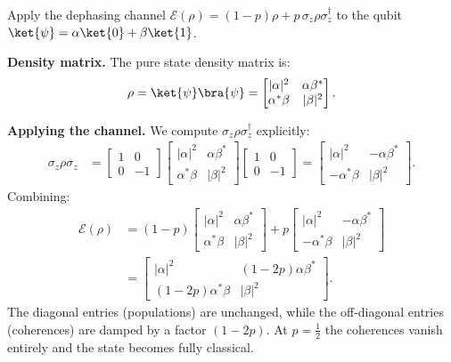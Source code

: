\documentclass[oneside]{academica}
\begin{document}
\begin{exercise*}
  Apply the dephasing channel $\mathcal{E}(\rho)=(1-p)\rho+p\,\sigma_z\rho\sigma_z^\dagger$
  to the qubit $\ket{\psi}=\alpha\ket{0}+\beta\ket{1}$.

  \textbf{Density matrix.}
  The pure state density matrix is:
  \begin{equation*}
    \rho = \ket{\psi}\bra{\psi} =
    \begin{bmatrix}|\alpha|^2 & \alpha\beta^* \\ \alpha^*\beta & |\beta|^2\end{bmatrix}.
  \end{equation*}

  \textbf{Applying the channel.}
  We compute $\sigma_z\rho\sigma_z^\dagger$ explicitly:
  \begin{align*}
    \sigma_z\rho\sigma_z &=
    \begin{bmatrix}1&0\\0&-1\end{bmatrix}
    \begin{bmatrix}|\alpha|^2 & \alpha\beta^* \\ \alpha^*\beta & |\beta|^2\end{bmatrix}
    \begin{bmatrix}1&0\\0&-1\end{bmatrix}
    = \begin{bmatrix}|\alpha|^2 & -\alpha\beta^* \\ -\alpha^*\beta & |\beta|^2\end{bmatrix}.
  \end{align*}
  Combining:
  \begin{align*}
    \mathcal{E}(\rho) &= (1-p)\begin{bmatrix}|\alpha|^2 & \alpha\beta^* \\ \alpha^*\beta & |\beta|^2\end{bmatrix}
    + p\begin{bmatrix}|\alpha|^2 & -\alpha\beta^* \\ -\alpha^*\beta & |\beta|^2\end{bmatrix} \\
    &= \begin{bmatrix}|\alpha|^2 & (1-2p)\alpha\beta^* \\ (1-2p)\alpha^*\beta & |\beta|^2\end{bmatrix}.
  \end{align*}
  The diagonal entries (populations) are unchanged, while the off-diagonal entries (coherences) are damped by a factor $(1-2p)$.
At $p=\tfrac{1}{2}$ the coherences vanish entirely and the state becomes fully classical.
\end{exercise*}
\end{document}
